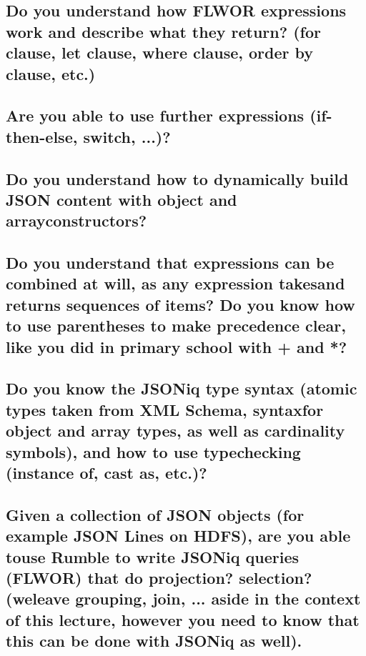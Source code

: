 \documentclass{article}
\begin{document}
\subsection{Do you understand how FLWOR expressions work and describe what they return? (for clause, let clause, where clause, order by clause, etc.)}
\subsection{Are you able to use further expressions (if-then-else, switch, ...)?}
\subsection{Do you understand how to dynamically build JSON content with object and arrayconstructors?}
\subsection{Do you understand that expressions can be combined at will, as any expression takesand returns sequences of items? Do you know how to use parentheses to make precedence clear, like you did in primary school with + and *?}
\subsection{Do you know the JSONiq type syntax (atomic types taken from XML Schema, syntaxfor object and array types, as well as cardinality symbols), and how to use typechecking (instance of, cast as, etc.)?}
\subsection{Given a collection of JSON objects (for example JSON Lines on HDFS), are you able touse Rumble to write JSONiq queries (FLWOR) that do projection? selection? (weleave grouping, join, ... aside in the context of this lecture, however you need to know that this can be done with JSONiq as well).}

\end{document}
